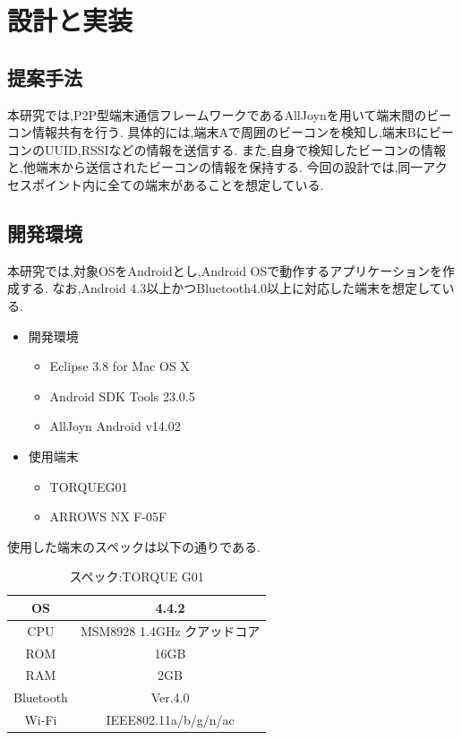 \chapter{設計と実装}
\label{chap:poordirection}

\section{提案手法}
本研究では,P2P型端末通信フレームワークであるAllJoynを用いて端末間のビーコン情報共有を行う.
具体的には,端末Aで周囲のビーコンを検知し,端末BにビーコンのUUID,RSSIなどの情報を送信する.
また,自身で検知したビーコンの情報と,他端末から送信されたビーコンの情報を保持する.
今回の設計では,同一アクセスポイント内に全ての端末があることを想定している.

\section{開発環境}
本研究では,対象OSをAndroidとし,Android OSで動作するアプリケーションを作成する.
なお,Android 4.3以上かつBluetooth4.0以上に対応した端末を想定している.
\begin{itemize}
\item 開発環境
\begin{itemize}
\item Eclipse 3.8 for Mac OS X
\item Android SDK Tools 23.0.5
\item AllJoyn Android v14.02
\end{itemize}
\item 使用端末
\begin{itemize}
\item TORQUEG01
\item ARROWS NX F-05F
\end{itemize}
\end{itemize}

使用した端末のスペックは以下の通りである.
\begin{table}[htbp]
\centering
\begin{tabular}{|c|c|} \hline
OS &  4.4.2 \\ \hline
CPU & MSM8928 1.4GHz クアッドコア \\ \hline
ROM & 16GB \\ \hline
RAM & 2GB \\ \hline
Bluetooth & Ver.4.0 \\ \hline
Wi-Fi & IEEE802.11a/b/g/n/ac \\ \hline
\end{tabular}
\caption{スペック:TORQUE G01}
\end{table}

